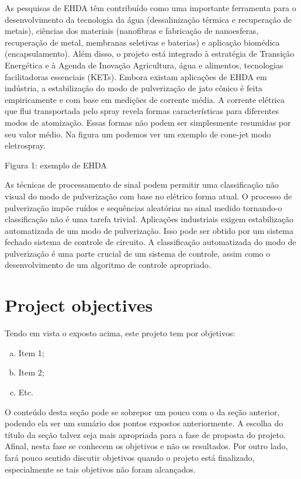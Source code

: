 As pesquisas de EHDA têm contribuído como uma importante ferramenta para
o desenvolvimento da tecnologia da água (dessalinização térmica e recuperação de metais), ciências dos materiais (nanofibras e
fabricação de nanoesferas, recuperação de metal, membranas seletivas e baterias) e aplicação biomédica
(encapsulamento). Além disso, o projeto está integrado à estratégia de Transição Energética e à Agenda de Inovação
Agricultura, água e alimentos, tecnologias facilitadoras essenciais (KETs). Embora existam aplicações de EHDA em
indústria, a estabilização do modo de pulverização de jato cônico é feita empiricamente e com base em medições de corrente média.
A corrente elétrica que flui transportada pelo spray revela formas características para diferentes modos de atomização.
Essas formas não podem ser simplesmente resumidas por seu valor médio. Na figura um podemos ver um exemplo de cone-jet
modo eletrospray.

Figura 1: exemplo de EHDA

As técnicas de processamento de sinal podem permitir uma classificação não visual do modo de pulverização com base no elétrico
forma atual. O processo de pulverização impõe ruídos e sequências aleatórias no sinal medido tornando-o
classificação não é uma tarefa trivial.
Aplicações industriais exigem estabilização automatizada de um modo de pulverização. Isso pode ser obtido por um sistema fechado
sistema de controle de circuito. A classificação automatizada do modo de pulverização é uma parte crucial de um sistema de controle, assim como
o desenvolvimento de um algoritmo de controle apropriado.

\section{Project objectives}
\label{sec:objetivos}

Tendo em vista o exposto acima, este projeto tem por objetivos:

\begin{enumerate}[a)]
\item Item 1;
\item Item 2; 
\item Etc.     
\end{enumerate}

O conteúdo desta seção pode se sobrepor um pouco com o da seção anterior, podendo ela ser um sumário dos pontos expostos anteriormente. A escolha do título da seção talvez seja mais apropriada para a fase de proposta do projeto. Afinal, nesta fase se conhecem os objetivos e não os resultados. Por outro lado, fará pouco sentido discutir objetivos quando o projeto está finalizado, especialmente se tais objetivos não foram alcançados. 


